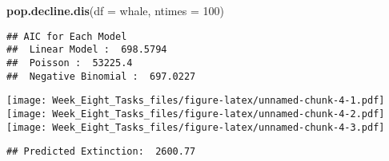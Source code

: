 \documentclass[]{article}
\newenvironment{Shaded}{\begin{snugshade}}{\end{snugshade}}
\newcommand{\CommentTok}[1]{\textcolor[rgb]{0.56,0.35,0.01}{\textit{#1}}}
\newcommand{\DataTypeTok}[1]{\textcolor[rgb]{0.13,0.29,0.53}{#1}}
\newcommand{\DecValTok}[1]{\textcolor[rgb]{0.00,0.00,0.81}{#1}}
\newcommand{\ErrorTok}[1]{\textcolor[rgb]{0.64,0.00,0.00}{\textbf{#1}}}
\newcommand{\KeywordTok}[1]{\textcolor[rgb]{0.13,0.29,0.53}{\textbf{#1}}}
\newcommand{\NormalTok}[1]{#1}
\newcommand{\OperatorTok}[1]{\textcolor[rgb]{0.81,0.36,0.00}{\textbf{#1}}}
\newcommand{\OtherTok}[1]{\textcolor[rgb]{0.56,0.35,0.01}{#1}}
\newcommand{\StringTok}[1]{\textcolor[rgb]{0.31,0.60,0.02}{#1}}
\begin{document}
\begin{Shaded}
\end{Shaded}

\begin{Shaded}
\begin{Highlighting}[]
\KeywordTok{pop.decline.dis}\NormalTok{(}\DataTypeTok{df =}\NormalTok{ whale, }\DataTypeTok{ntimes =} \DecValTok{100}\NormalTok{)}
\end{Highlighting}
\end{Shaded}

\begin{verbatim}
## AIC for Each Model 
##  Linear Model :  698.5794 
##  Poisson :  53225.4 
##  Negative Binomial :  697.0227
\end{verbatim}

\texttt{[image: Week\_Eight\_Tasks\_files/figure-latex/unnamed-chunk-4-1.pdf]}
\texttt{[image: Week\_Eight\_Tasks\_files/figure-latex/unnamed-chunk-4-2.pdf]}
\texttt{[image: Week\_Eight\_Tasks\_files/figure-latex/unnamed-chunk-4-3.pdf]}

\begin{verbatim}
## Predicted Extinction:  2600.77
\end{verbatim}
\end{document}
